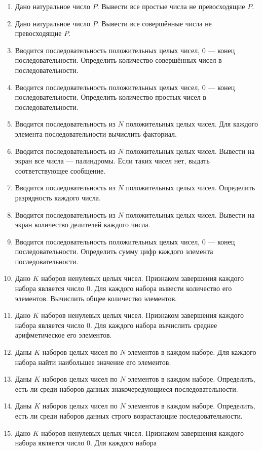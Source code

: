 \begin{enumerate}
\item Дано натуральное число $P$. Вывести все простые числа не
превосходящие $P$.
\item Дано натуральное число $P$. Вывести все совершённые числа не превосходящие
$P$.
\item Вводится последовательность положительных целых чисел, 0 --- конец последовательности. Определить количество
совершённых чисел в последовательности.
\item Вводится последовательность положительных целых чисел, 0 --- конец последовательности. Определить количество простых
чисел в последовательности.
\item Вводится последовательность из $N$ положительных целых чисел. Для каждого элемента
последовательности вычислить факториал.
\item Вводится последовательность из $N$ положительных целых чисел. Вывести на экран все числа ---
палиндромы. Если таких чисел нет, выдать соответствующее сообщение.
\item Вводится последовательность из $N$ положительных целых чисел. Определить разрядность каждого
числа.
\item Вводится последовательность из $N$ положительных целых чисел. Вывести на экран количество
делителей каждого числа.
\item Вводится последовательность положительных целых чисел, 0 --- конец последовательности. Определить сумму цифр каждого
элемента последовательности.
\item Дано $K$ наборов ненулевых целых чисел. Признаком завершения каждого набора является число 0. Для каждого набора
вывести количество его элементов. Вычислить общее количество элементов.
\item Дано $K$ наборов ненулевых целых чисел. Признаком завершения каждого набора является число 0. Для каждого набора
вычислить среднее арифметическое его элементов.
\item Даны $K$ наборов целых чисел по $N$ элементов в каждом наборе. Для каждого набора найти наибольшее значение его
элементов.
\item Даны $K$ наборов целых чисел по $N$ элементов в каждом наборе. Определить, есть ли среди наборов данных
знакочередующиеся последовательности.
\item Даны $K$ наборов целых чисел по $N$ элементов в каждом наборе. Определить, есть ли среди наборов данных строго
возрастающие последовательности.
\item Дано $K$ наборов ненулевых целых чисел. Признаком завершения каждого набора является число 0. Для каждого набора

\end{enumerate}
